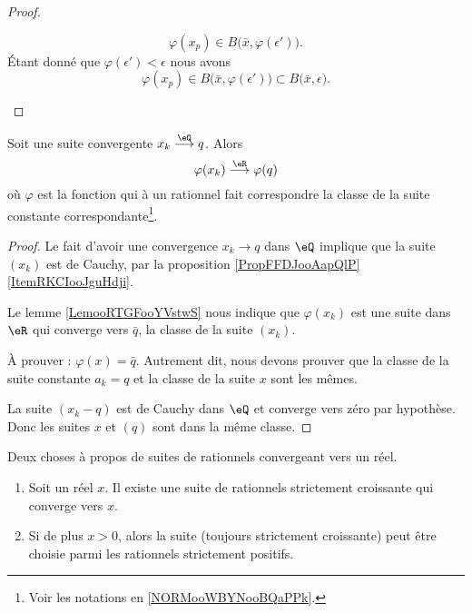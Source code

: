 \begin{proof}
\begin{subproof}
\begin{subproof}
			\begin{equation}
				\varphi(x_p)\in B\big( \bar x,\varphi(\epsilon') \big).
			\end{equation}
			Étant donné que \( \varphi(\epsilon')<\epsilon\) nous avons
			\begin{equation}
				\varphi(x_p)\in B\big( \bar x,\varphi(\epsilon') \big)\subset B\big( \bar x,\epsilon \big).
			\end{equation}
		\end{subproof}
	\end{subproof}
\end{proof}

\begin{proposition}     \label{PROPooZSQYooWRKNGY}
	Soit une suite convergente \( x_k\stackrel{\eQ}{\longrightarrow}q\). Alors
	\begin{equation}
		\varphi(x_k)\stackrel{\eR}{\longrightarrow}\varphi(q)
	\end{equation}
	où \( \varphi\) est la fonction qui à un rationnel fait correspondre la classe de la suite constante correspondante\footnote{Voir les notations en \ref{NORMooWBYNooBQaPPk}.}.
\end{proposition}

\begin{proof}
	Le fait d'avoir une convergence \( x_k\to q\) dans \( \eQ\) implique que la suite \( (x_k)\) est de Cauchy, par la proposition \ref{PropFFDJooAapQlP}\ref{ItemRKCIooJguHdji}.

	Le lemme \ref{LemooRTGFooYVstwS} nous indique que \( \varphi(x_k)\) est une suite dans \( \eR\) qui converge vers \( \bar q\), la classe de la suite \( (x_k)\).

	À prouver : \( \varphi(x)=\bar q\). Autrement dit, nous devons prouver que la classe de la suite constante \( a_k=q\) et la classe de la suite \( x\) sont les mêmes.

	La suite \( (x_k-q)\) est de Cauchy dans \( \eQ\) et converge vers zéro par hypothèse. Donc les suites \(x\) et \( (q)\) sont dans la même classe.
\end{proof}

\begin{proposition}     \label{PROPooFGBOooHiZqbs}
	Deux choses à propos de suites de rationnels convergeant vers un réel.
	\begin{enumerate}
		\item       \label{ITEMooMAVYooKFtqlx}
		      Soit un réel \( x\). Il existe une suite de rationnels strictement croissante qui converge vers \( x\).
		\item       \label{ITEMooVOVYooFUbccG}
		      Si de plus \( x>0\), alors la suite (toujours strictement croissante) peut être choisie parmi les rationnels strictement positifs.
	\end{enumerate}
\end{proposition}


